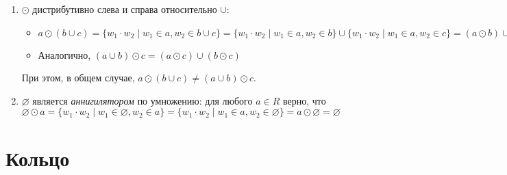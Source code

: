 \begin{example}
\begin{enumerate}
\item $\odot$ дистрибутивно слева и справа относительно $\cup$:
\begin{itemize}
	\item $a \odot (b \cup c) = \{ w_1 \cdot w_2 \mid  w_1 \in a, w_2 \in b \cup c\} = \{ w_1 \cdot w_2 \mid  w_1 \in a, w_2 \in b \} \cup  \{ w_1 \cdot w_2 \mid  w_1 \in a, w_2 \in c \} =  (a \odot b) \cup (a \odot c)$
    \item Аналогично, $(a \cup b) \odot c = (a \odot c) \cup (b \odot c)$
\end{itemize}
При этом, в общем случае, $a \odot (b \cup c) \neq (a \cup b) \odot c$.


\item $\varnothing$ является \textit{аннигилятором} по умножению: для любого $a \in R$ верно, что
$\varnothing \odot a =  \{ w_1 \cdot w_2 \mid w_1 \in \varnothing, w_2 \in a \} =  \{ w_1 \cdot w_2 \mid w_1 \in a, w_2 \in \varnothing \} = a \odot \varnothing = \varnothing$

\end{enumerate}

\end{example}

\section{Кольцо}


